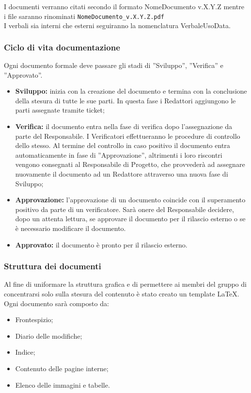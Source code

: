 I documenti verranno citati secondo il formato NomeDocumento v.X.Y.Z mentre i file saranno rinominati \texttt{NomeDocumento\_v.X.Y.Z.pdf} \\
I verbali sia interni che esterni seguiranno la nomenclatura VerbaleUsoData.

\subsubsection{Ciclo di vita documentazione}
Ogni documento formale deve passare gli stadi di ”Sviluppo”, ”Verifica” e ”Approvato”.
\begin{itemize}
	\item \textbf{Sviluppo:} inizia con la creazione del documento e termina con la conclusione	della stesura di tutte le sue parti. In questa fase i Redattori aggiungono le parti assegnate tramite ticket;
	
	\item  \textbf{Verifica:} il documento entra nella fase di verifica dopo l’assegnazione da
	parte del Responsabile. I Verificatori effettueranno le procedure di controllo
	dello stesso.
	Al termine del controllo in caso positivo il documento entra automaticamente
	in fase di ”Approvazione”, altrimenti i loro riscontri vengono consegnati
	al Responsabile di Progetto, che provvederà ad assegnare nuovamente il
	documento ad un Redattore attraverso una nuova fase di Sviluppo;
	
	\item  \textbf{Approvazione:} l’approvazione di un documento coincide con il superamento
	positivo da parte di un verificatore. 
	Sarà onere del Responsabile decidere, dopo un attenta lettura, se approvare il documento per il rilascio esterno o se è necessario modificare il documento.

	
	\item  \textbf{Approvato:} il documento è pronto per il rilascio esterno.
\end{itemize}


\subsubsection{Struttura dei documenti}
Al fine di uniformare la struttura grafica e di permettere ai membri del gruppo di concentrarsi solo sulla stesura del contenuto è stato creato un template \LaTeX.
Ogni documento sarà composto da:
\begin{itemize}
	\item Frontespizio;
	\item Diario delle modifiche;
	\item Indice;
	\item Contenuto delle pagine interne;
	\item Elenco delle immagini e tabelle.
\end{itemize}
